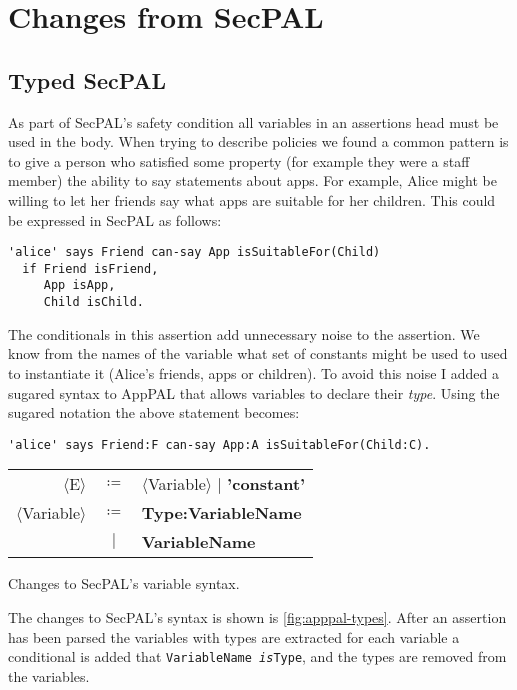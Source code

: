 \documentclass[thesis.tex]{subfiles}
\begin{document}
\section{Changes from SecPAL}

\subsection{Typed SecPAL}
As part of SecPAL's safety condition all variables in an assertions head must be
used in the body.  When trying to describe policies we found a common pattern is
to give a person who satisfied some property (for example they were a staff
member) the ability to say statements about apps.
For example, Alice might be willing to let her friends say what apps are
suitable for her children.  This could be expressed in SecPAL as follows:
\begin{lstlisting}
'alice' says Friend can-say App isSuitableFor(Child)
  if Friend isFriend,
     App isApp,
     Child isChild.
\end{lstlisting}
The conditionals in this assertion add unnecessary noise to the assertion. We
know from the names of the variable what set of constants might be used to used
to instantiate it (Alice's friends, apps or children). To avoid this noise I
added a sugared syntax to AppPAL that allows variables to declare their
\emph{type}.  Using the sugared notation the above statement becomes:
\begin{lstlisting}
'alice' says Friend:F can-say App:A isSuitableFor(Child:C).
\end{lstlisting}
\begin{marginfigure}
  \newcommand{\nonterminal}[1]{$\langle$#1$\rangle$}
  \newcommand{\terminal}[1]{\textbf{#1}}
  \begin{tabular}{r c l}
    \footnotesize
    \nonterminal{E}         & $\coloneqq$ & \nonterminal{Variable} $\vert$ \terminal{'constant'} \\
    \nonterminal{Variable}  & $\coloneqq$ & \terminal{Type}\terminal{:}\terminal{VariableName} \\
                            & $\vert$     & \terminal{VariableName}
  \end{tabular}
  \caption{Changes to SecPAL's variable syntax.}
  \label{fig:apppal-types}
\end{marginfigure}
The changes to SecPAL's syntax is shown is \autoref{fig:apppal-types}.
After an assertion has been parsed the variables with types are extracted for
each variable a conditional is added that \texttt{VariableName \emph{is}Type},
and the types are removed from the variables.
\end{document}
